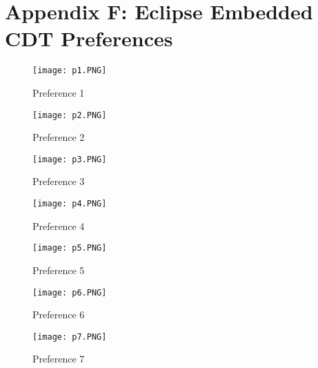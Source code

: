 \chapter*{Appendix F: Eclipse Embedded CDT Preferences}
\label{F}


\begin{figure}[H]
\begin{center}
\texttt{[image: p1.PNG]}
\caption{Preference 1}
\label{fig:p1}
\end{center}
\end{figure}

\begin{figure}[H]
\begin{center}
\texttt{[image: p2.PNG]}
\caption{Preference 2}
\label{fig:p2}
\end{center}
\end{figure}

\begin{figure}[H]
\begin{center}
\texttt{[image: p3.PNG]}
\caption{Preference 3}
\label{fig:p3}
\end{center}
\end{figure}

\begin{figure}[H]
\begin{center}
\texttt{[image: p4.PNG]}
\caption{Preference 4}
\label{fig:p4}
\end{center}
\end{figure}

\begin{figure}[H]
\begin{center}
\texttt{[image: p5.PNG]}
\caption{Preference 5}
\label{fig:p5}
\end{center}
\end{figure}

\begin{figure}[H]
\begin{center}
\texttt{[image: p6.PNG]}
\caption{Preference 6}
\label{fig:p6}
\end{center}
\end{figure}

\begin{figure}[H]
\begin{center}
\texttt{[image: p7.PNG]}
\caption{Preference 7}
\label{fig:p7}
\end{center}
\end{figure}

